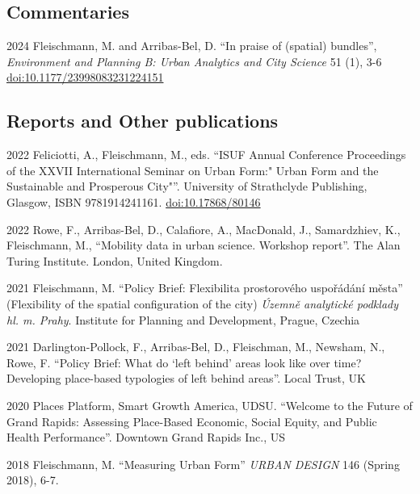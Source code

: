 \documentclass[12pt,a4paper]{report}
\begin{document}
    \subsection*{Commentaries}

    \begin{tablist}

        \item[2024] \tab{}Fleischmann, M. and Arribas-Bel, D. \enquote{In praise of (spatial) bundles}, \textit{Environment and Planning B: Urban Analytics and City Science} 51 (1), 3-6 \href{https://doi.org/10.1177/23998083231224151}{doi:10.1177/23998083231224151}

    \end{tablist}

    \subsection*{Reports and Other publications}

    \begin{tablist}

        \item[2022] \tab{}Feliciotti, A., Fleischmann, M., eds. \enquote{ISUF Annual Conference Proceedings of the XXVII International Seminar on Urban Form:" Urban Form and the Sustainable and Prosperous City"}. University of Strathclyde Publishing, Glasgow, ISBN 9781914241161. \href{https://doi.org/10.17868/80146}{doi:10.17868/80146}
        \item[2022] \tab{}Rowe, F., Arribas-Bel, D., Calafiore, A., MacDonald, J., Samardzhiev, K., Fleischmann, M., \enquote{Mobility data in urban science. Workshop report}. The Alan Turing Institute. London, United Kingdom.
        \item[2021] \tab{}Fleischmann, M. \enquote{Policy Brief: Flexibilita prostorového uspořádání města} (Flexibility of the spatial configuration of the city) \textit{Územně analytické podklady hl. m. Prahy}. Institute for Planning and Development, Prague, Czechia
        \item[2021] \tab{}Darlington-Pollock, F., Arribas-Bel, D., Fleischman, M., Newsham, N., Rowe, F. \enquote{Policy Brief: What do ‘left behind’ areas look like over time? Developing place-based typologies of left behind areas}. Local Trust, UK
        \item[2020] \tab{}Places Platform, Smart Growth America, UDSU. \enquote{Welcome to the Future of Grand Rapids: Assessing Place-Based Economic, Social Equity, and Public Health Performance}. Downtown Grand Rapids Inc., US
        \item[2018] \tab{}Fleischmann, M. \enquote{Measuring Urban Form} \textit{URBAN DESIGN} 146 (Spring 2018), 6-7.

    \end{tablist}
\end{document}

